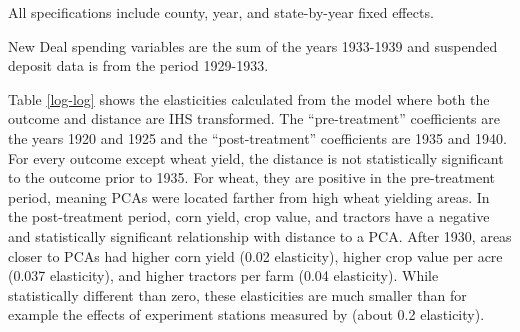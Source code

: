 \documentclass[12pt]{article}
\begin{document}
\begin{table}
\begin{threeparttable}[t]
\begin{tablenotes}
        \item {\footnotesize All specifications include county, year, and state-by-year fixed effects.}
        \item {\footnotesize New Deal spending variables are the sum of the years 1933-1939 and suspended deposit data is from the period 1929-1933. }
    \end{tablenotes}
\end{threeparttable}
\label{tab:full_sample}
\end{table}



Table \ref{log-log} shows the elasticities calculated from the model where both the outcome and distance are IHS transformed.
The ``pre-treatment'' coefficients are the years 1920 and 1925 and the ``post-treatment'' coefficients are 1935 and 1940.
For every outcome except wheat yield, the distance is not statistically significant to the outcome prior to 1935.
For wheat, they are positive in the pre-treatment period, meaning PCAs were located farther from high wheat yielding areas.
In the post-treatment period, corn yield, crop value, and tractors have a negative and statistically significant relationship with distance to a PCA.
After 1930, areas closer to PCAs had higher corn yield (0.02 elasticity), higher crop value per acre (0.037 elasticity), and higher tractors per farm (0.04 elasticity).
While statistically different than zero, these elasticities are much smaller than for example the effects of experiment stations measured by \citet{kantor_research_2019} (about 0.2 elasticity).
\end{document}
